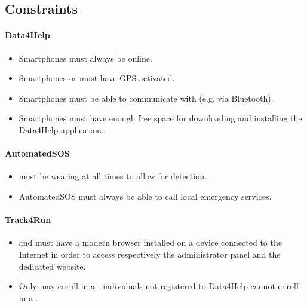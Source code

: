 \documentclass[../../rasd.tex]{subfiles}
\begin{document}
	\subsection{Constraints}
		\paragraph{Data4Help}
		 	\begin{itemize}	
		 		\item Smartphones must always be online.
		 		\item Smartphones or  must have GPS activated.
		 		\item Smartphones must be able to communicate with  (e.g. via Bluetooth).
		 		\item Smartphones must have enough free space for downloading and installing the Data4Help application.
		 	\end{itemize}
		 \paragraph{AutomatedSOS}
		 	\begin{itemize}
		 		\item {} must be wearing  at all times to allow for  detection.
		 		\item AutomatedSOS must always be able to call local emergency services.
		 	\end{itemize}
		 \paragraph{Track4Run}
		 	\begin{itemize}
		 		\item {} and  must have a modern browser installed on a device connected to the Internet in order to access respectively the  administrator panel and the  dedicated website.
		 		\item Only  may enroll in a : individuals not registered to Data4Help cannot enroll in a .
		 	\end{itemize}
\end{document}
